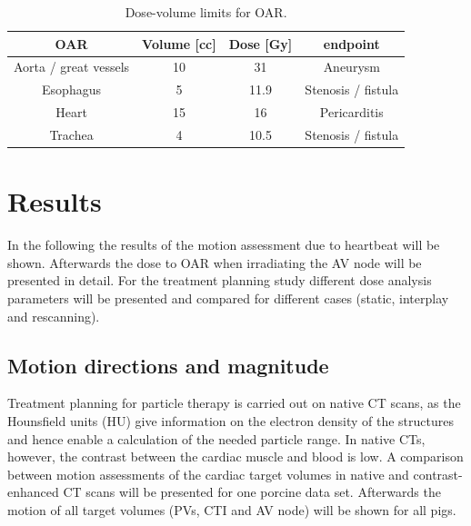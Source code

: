 \documentclass[type=dr, dr=rernat, accentcolor=tud7b,colorbacktitle, bigchapter, openright, twoside, 12pt ]{tudthesis}
\begin{document}

\begin{table}[H]
  \centering
  \caption{Dose-volume limits for OAR.}
  \begin{tabular}{|c|c|c|c|}
    \hline\hline
    OAR & Volume [cc] & Dose [Gy] & endpoint \\
    \hline
    Aorta / great vessels & 10 & 31 & Aneurysm \\
    Esophagus & 5 & 11.9 &  Stenosis / fistula \\
    Heart & 15 & 16 & Pericarditis \\
    Trachea & 4 & 10.5 & Stenosis / fistula \\
    \hline\hline
  \end{tabular}
  \label{tab:RTOG:pig}
\end{table}


\section{Results}

In the following the results of the motion assessment due to heartbeat will be shown. Afterwards the dose to OAR when irradiating the AV node 
will be presented in detail. For the treatment planning study different dose analysis parameters will be presented and compared for different 
cases (static, interplay and rescanning). 

\subsection{Motion directions and magnitude}
\label{subsec:motion:pigs}
Treatment planning for particle therapy is carried out on native CT scans, as the Hounsfield units (HU) give information on the electron 
density of the structures and hence enable a calculation of the needed particle range. 
In native CTs, however, the contrast between the cardiac muscle and blood is low.  
A comparison between motion assessments of the cardiac target volumes 
in native and contrast-enhanced CT scans will be presented for one porcine data set. Afterwards the motion of all target volumes (PVs, CTI and 
AV node) will be shown for all pigs. 
\end{document}
